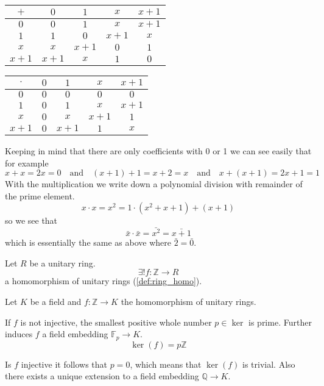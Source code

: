\begin{center}
   \begin{tabular}{c|c c c c}
      \(+\)   & \(0\)   & \(1\)   & \(x\)   & \(x+1\) \\ \hline
      \(0\)   & \(0\)   & \(1\)   & \(x\)   & \(x+1\) \\
      \(1\)   & \(1\)   & \(0\)   & \(x+1\) & \(x\)   \\
      \(x\)   & \(x\)   & \(x+1\) & \(0\)   & \(1\)   \\
      \(x+1\) & \(x+1\) & \(x\)   & \(1\)   & \(0\)   \\
   \end{tabular}
   \quad
   \begin{tabular}{c|c c c c}
      \(\cdot\) & \(0\) & \(1\)   & \(x\)   & \(x+1\) \\ \hline
      \(0\)     & \(0\) & \(0\)   & \(0\)   & \(0\)   \\
      \(1\)     & \(0\) & \(1\)   & \(x\)   & \(x+1\) \\
      \(x\)     & \(0\) & \(x\)   & \(x+1\) & \(1\)   \\
      \(x+1\)   & \(0\) & \(x+1\) & \(1\)   & \(x\)   \\
   \end{tabular}
\end{center}
Keeping in mind that there are only coefficients with 0 or 1 we can see easily that for example
\[x + x = 2x = 0 \quad\text{and}\quad  (x+1) + 1 = x + 2 = x \quad\text{and}\quad x + (x+1) = 2x + 1 = 1\]
With the multiplication we write down a polynomial division with remainder of the prime element.
\[x \cdot x = x^2 = 1 \cdot (x^2 + x + 1) + (x+1)\]
so we see that
\[\bar{x} \cdot \bar{x} = \bar{x^2} = \bar{x+1}\]
which is essentially the same as above where \(\bar{2} = \bar{0}\).

\begin{proposition}
   Let \(R\) be a unitary ring.
   \[\exists! f: \mathbb{Z} \to R\]
   a homomorphism of unitary rings (\ref{def:ring_homo}).
\end{proposition}

\begin{proposition}
   Let \(K\) be a field and \(f: \mathbb{Z} \to K\) the homomorphism of unitary rings.

   If \(f\) is not injective, the smallest positive whole number \(p \in \ker\) is prime.
   Further induces \(f\) a field embedding \(\mathbb{F}_p \to K\).
   \[\ker(f) = p\mathbb{Z}\]

   Is \(f\) injective it follows that \(p = 0\), which means that \(\ker(f)\) is trivial.
   Also there exists a unique extension to a field embedding \(\mathbb{Q} \to K\).
\end{proposition}


